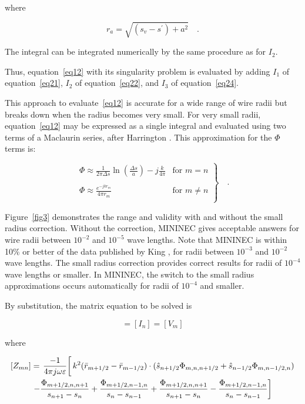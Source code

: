 \documentclass[12pt]{article}
\begin{document}
\noindent where

\[
r_a = \sqrt{(s_v - s^\prime) + a^2}
\quad.
\]

\noindent The integral can be integrated numerically by the same
procedure as for $I_2$.

Thus, equation~\eqref{eq12} with its singularity problem is evaluated by
adding $I_1$ of equation~\eqref{eq21}, $I_2$ of equation~\eqref{eq22}, and
$I_3$ of equation~\eqref{eq24}.

This approach to evaluate~\eqref{eq12} is accurate for a wide range of
wire radii but breaks down when the radius becomes very small. For very
small radii, equation~\eqref{eq12} may be expressed as a single integral
and evaluated using two terms of a Maclaurin series, after Harrington
\cite{r5}. This approximation for the $\Phi$ terms is:

\begin{equation}
\left.
\begin{array}{ll}
\Phi \approx \frac{1}{2\pi\Delta s}\ln\left(\frac{\Delta s}{a}\right)
-j\frac{k}{4\pi}                   & \mbox{for } m=n          \\
\\
\Phi \approx \frac{e^{-jkr_m}}{4\pi r_m} & \mbox{for } m\ne n \\
\end{array}
\right\}
\quad.
\label{eq25}
\end{equation}

Figure~\ref{fig3} demonstrates the range and validity with and without
the small radius correction. Without the correction, MININEC gives
acceptable answers for wire radii between $10^{-2}$ and $10^{-5}$ wave
lengths. Note that MININEC is within 10\% or better of the data
published by King \cite{r8} \cite{r9}, for radii
between $10^{-3}$ and $10^{-2}$ wave lengths. The small radius
correction provides correct results for radii of $10^{-4}$ wave lengths
or smaller. In MININEC, the switch to the small radius approximations
occurs automatically for radii of $10^{-4}$ and smaller.

By substitution, the matrix equation to be solved is

\begin{equation}
[Z_{mn}] = [I_n] = [V_m]
\label{eq26}
\end{equation}

\noindent where

\begin{equation}
\begin{gathered}\relax
[Z_{mn}] = \left.\frac{-1}{4\pi j\omega\varepsilon}\right[
k^2(\bar{r}_{m+1/2} - \bar{r}_{m-1/2}) \cdot
(\hat{s}_{n+1/2}\Phi_{m,n,n+1/2} + \hat{s}_{n-1/2}\Phi_{m,n-1/2,n}) \\
\left.
-\frac{\Phi_{m+1/2,n,n+1}}{s_{n+1}-s_n}+\frac{\Phi_{m+1/2,n-1,n}}{s_n-s_{n-1}}
+\frac{\Phi_{m+1/2,n,n+1}}{s_{n+1}-s_n}-\frac{\Phi_{m+1/2,n-1,n}}{s_n-s_{n-1}}
\right]\\
\end{gathered}
\label{eq27}
\end{equation}
\end{document}
